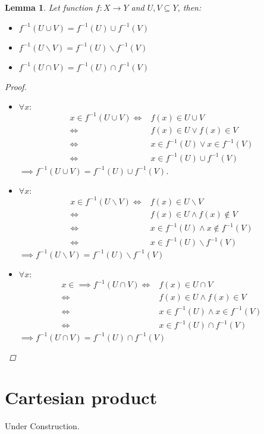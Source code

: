 \documentclass[a4paper]{book}
\newtheorem*{proof}{\textit{Proof.}}
\theoremstyle{break}
\newtheorem{lemma}{Lemma}[section]
\begin{document}
			\begin{lemma}
				Let function $f:X\to Y$ and $U,V\subseteq Y$, then:
				\begin{itemize}
					\item $f^{-1}(U\cup V)=f^{-1}(U)\cup f^{-1}(V)$
					\item $f^{-1}(U\backslash V)=f^{-1}(U)\backslash f^{-1}(V)$
					\item $f^{-1}(U\cap V)=f^{-1}(U)\cap f^{-1}(V)$
				\end{itemize}
				\begin{proof}~
					\begin{itemize}
						\item $\forall x:$
						\begin{align*}
							x\in f^{-1}(U\cup V)\iff & f(x)\in U\cup V\\
							\iff & f(x)\in U \lor f(x)\in V\\
							\iff & x\in f^{-1}(U) \lor x\in f^{-1}(V)\\
							\iff & x\in f^{-1}(U)\cup f^{-1}(V)
						\end{align*}
						$\implies f^{-1}(U\cup V)=f^{-1}(U)\cup f^{-1}(V)$.
						\item $\forall x:$
						\begin{align*}
							x\in f^{-1}(U\backslash V) \iff & f(x)\in U\backslash V\\
							\iff & f(x)\in U \land f(x)\notin V\\
							\iff & x\in f^{-1}(U) \land x\notin f^{-1}(V)\\
							\iff & x\in f^{-1}(U)\backslash f^{-1}(V)
						\end{align*}
						$\implies f^{-1}(U\backslash V)=f^{-1}(U)\backslash f^{-1}(V)$
						\item $\forall x:$
						\begin{align*}
							x\in \implies f^{-1}(U\cap V) \iff & f(x)\in U\cap V\\
							\iff & f(x)\in U \land f(x)\in V\\
							\iff & x\in f^{-1}(U)\land x\in f^{-1}(V)\\
							\iff & x\in f^{-1}(U)\cap f^{-1}(V)
						\end{align*}
						$\implies f^{-1}(U\cap V)=f^{-1}(U)\cap f^{-1}(V)$
					\end{itemize}
				\end{proof}
			\end{lemma}
		\section{Cartesian product}
			Under Construction.
\end{document}
